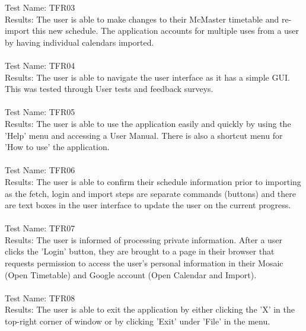\documentclass[12pt, titlepage]{article}
\begin{document}
	Test Name: TFR03 \\
	
	Results: The user is able to make changes to their McMaster timetable and re-import this new schedule. The application accounts for multiple uses from a user by having individual calendars imported.\\ \\
	
	Test Name: TFR04 \\
	
	Results: The user is able to navigate the user interface as it has a simple GUI. This was tested through User tests and feedback surveys. \\ \\

	Test Name: TFR05 \\
	
	Results: The user is able to use the application easily and quickly by using the 'Help' menu and accessing a User Manual. There is also a shortcut menu for 'How to use' the application. \\ \\

	Test Name: TFR06 \\
	
	Results: The user is able to confirm their schedule information prior to importing as the fetch, login and import steps are separate commands (buttons) and there are text boxes in the user interface to update the user on the current progress. \\ \\

	Test Name: TFR07 \\
	
	Results: The user is informed of processing private information. After a user clicks the 'Login' button, they are brought to a page in their browser that requests permission to access the user's personal information in their Mosaic (Open Timetable) and Google account (Open Calendar and Import). \\ \\	
	
	Test Name: TFR08 \\
	
	Results: The user is able to exit the application by either clicking the 'X' in the top-right corner of window or by clicking 'Exit' under 'File' in the menu. \\ \\
\end{document}
